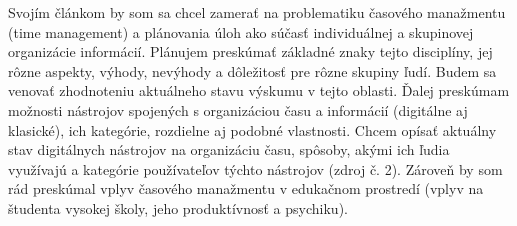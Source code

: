 Svojím článkom by som sa chcel zamerať na problematiku časového manažmentu (time management) a plánovania úloh ako súčasť individuálnej a skupinovej organizácie informácií. Plánujem preskúmať základné znaky tejto disciplíny, jej rôzne aspekty, výhody, nevýhody a dôležitosť pre rôzne skupiny ľudí. Budem sa venovať zhodnoteniu aktuálneho stavu výskumu v tejto oblasti. Ďalej preskúmam možnosti nástrojov spojených s organizáciou času a informácií (digitálne aj klasické), ich kategórie, rozdielne aj podobné vlastnosti. Chcem opísať aktuálny stav digitálnych nástrojov na organizáciu času, spôsoby, akými ich ľudia využívajú a kategórie používateľov týchto nástrojov (zdroj č. 2). Zároveň by som rád preskúmal vplyv časového manažmentu v edukačnom prostredí (vplyv na študenta vysokej školy, jeho produktívnosť a psychiku). 